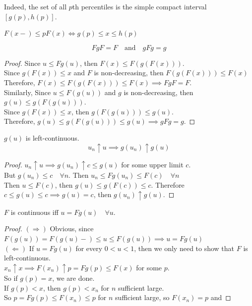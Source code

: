 \documentclass[11pt]{article}
\numberwithin{equation}{section}
\begin{document}
\remark
Indeed, the set of all $p$th percentiles is the simple compact interval $[g(p), h(p)]$.

\corollary $F(x-) \leq p F(x) \iff g(p) \leq x \leq h(p)$

\corollary $$FgF = F\quad \text{and} \quad gFg = g$$
\begin{proof}
	Since $u \leq Fg(u)$, then $F(x) \leq F(g(F(x)))$. \\
	Since $g(F(x)) \leq x$ and $F$ is non-decreasing, then $F(g(F(x))) \leq F(x)$ \\
	Therefore, $F(x) \leq F(g(F(x))) \leq F(x) \implies FgF = F$.\\
	Similarly, Since $u \leq F(g(u))$ and $g$ is non-decreasing, then $g(u) \leq g(F(g(u)))$.\\
	Since $g(F(x)) \leq x$, then $g(F(g(u))) \leq g(u)$.\\
	Therefore, $g(u) \leq g(F(g(u))) \leq g(u) \implies gFg = g$.
\end{proof}

\corollary $g(u)$ is left-continuous.
\begin{equation}
	u_n \uparrow u \implies g(u_n) \uparrow g(u)
\end{equation}
\begin{proof}
	$u_n \uparrow u \implies g(u_n) \uparrow c \leq g(u)$ for some upper limit $c$. \\
	But $g(u_n) \leq c \quad \forall n$. Then $u_n \leq Fg(u_n) \leq F(c) \quad \forall n$ \\
	Then $u \leq F(c)$, then $g(u) \leq g(F(c)) \leq c$.
	Therefore $c \leq g(u) \leq c \implies g(u) = c$, then $g(u_n) \uparrow g(u)$.
\end{proof}

\corollary \label{u=Fg(u)}$F$ is continuous iff $u = Fg(u) \quad \forall u$.
\begin{proof}
	$(\Rightarrow)$ Obvious, since $F(g(u)) = F(g(u)-) \leq u \leq F(g(u)) \implies u = Fg(u)$ \\
	$(\Leftarrow)$  If $u = Fg(u)$ for every $0 < u < 1$, then we only need to show that $F$ is left-continuous.\\
	$x_n \uparrow x \implies F(x_n) \uparrow p = Fg(p) \leq F(x)$ for some $p$.\\
	So if $g(p) = x$, we are done. \\
	If $g(p) < x$, then $g(p) < x_n$ for $n$ sufficient large.\\
	So $p = Fg(p) \leq F(x_n) \leq p$ for $n$ sufficient large, so $F(x_n) = p$ and 
\end{proof}
\end{document}

